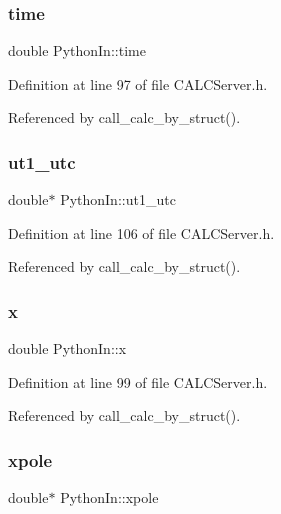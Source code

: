 \subsubsection{\texorpdfstring{time}{time}}
{\footnotesize\ttfamily double Python\+In\+::time}



Definition at line 97 of file C\+A\+L\+C\+Server.\+h.



Referenced by call\+\_\+calc\+\_\+by\+\_\+struct().

\mbox{\label{struct_python_in_a8d59549eb346267d7607de08fc25d79f}} 
\subsubsection{\texorpdfstring{ut1\+\_\+utc}{ut1\_utc}}
{\footnotesize\ttfamily double$\ast$ Python\+In\+::ut1\+\_\+utc}



Definition at line 106 of file C\+A\+L\+C\+Server.\+h.



Referenced by call\+\_\+calc\+\_\+by\+\_\+struct().

\mbox{\label{struct_python_in_acffa2c5e1d28931e7766098deb947f55}} 
\subsubsection{\texorpdfstring{x}{x}}
{\footnotesize\ttfamily double Python\+In\+::x}



Definition at line 99 of file C\+A\+L\+C\+Server.\+h.



Referenced by call\+\_\+calc\+\_\+by\+\_\+struct().

\mbox{\label{struct_python_in_a8e83e7f449767dad0d58df06a0511e76}} 
\subsubsection{\texorpdfstring{xpole}{xpole}}
{\footnotesize\ttfamily double$\ast$ Python\+In\+::xpole}



